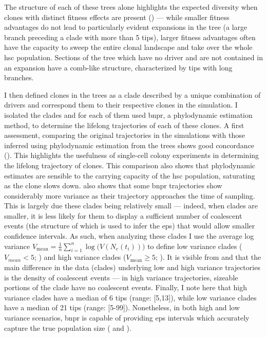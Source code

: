 The structure of each of these trees alone highlights the expected diversity when clones with distinct fitness effects are present () --- while smaller fitness advantages do not lead to particularly evident expansions in the tree (a large branch preceding a clade with more than 5 tips), larger fitness advantages often have the capacity to sweep the entire clonal landscape and take over the whole \ac{hsc} population. Sections of the tree which have no driver and are not contained in an expansion have a comb-like structure, characterized by tips with long branches.

\begin{figure}[!ht]
	\label{fig:trees-simulated-examples}
\end{figure}

I then defined clones in the trees as a clade described by a unique combination of drivers and correspond them to their respective clones in the simulation. I isolated the clades and for each of them used \ac{bnpr}, a phylodynamic estimation method, to determine the lifelong trajectories of each of these clones. A first assessment, comparing the original trajectories in the simulations with those inferred using phylodynamic estimation from the trees shows good concordance (). This highlights the usefulness of single-cell colony experiments in determining the lifelong trajectory of clones. This comparison also shows that phylodynamic estimates are sensible to the carrying capacity of the \ac{hsc} population, saturating as the clone slows down.  also shows that some \ac{bnpr} trajectories show considerably more variance as their trajectory approaches the time of sampling. This is largely due these clades being relatively small --- indeed, when clades are smaller, it is less likely for them to display a sufficient number of coalescent events (the structure of which is used to infer the \ac{eps}) that would allow smaller confidence intervals. As such, when analyzing these clades I use the average log variance $V_{\mathrm{mean}} = \frac{1}{n}\sum_{i=1}^{n}{\log(V(N_e(t_i))})$ to define low variance clades ($V_{mean} < 5$; ) and high variance clades ($V_{\mathrm{mean}} \geq 5$; ). It is visible from  and  that the main difference in the data (clades) underlying low and high variance trajectories is the density of coalescent events --- in high variance trajectories, sizeable portions of the clade have no coalescent events. Finally, I note here that high variance clades have a median of 6 tips (range: [5,13]), while low variance clades have a median of 21 tips (range: [5-99]). Nonetheless, in both high and low variance scenarios, \ac{bnpr} is capable of providing \ac{eps} intervals which accurately capture the true population size ( and ). 

